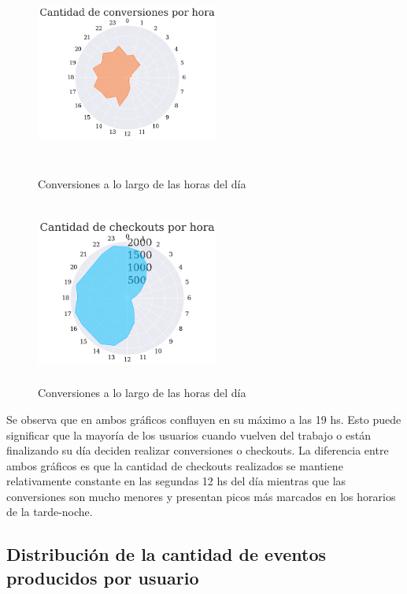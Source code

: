 \documentclass[a4paper]{article}
\begin{document}
\begin{figure}[h!]
	\centering
	\begin{minipage}[b]{0.4\textwidth}
		\includegraphics[width=6cm,height=6cm,keepaspectratio]{figures/040-hours-conversion-radarchart.png}
		\caption{Conversiones a lo largo de las horas del día}
	\end{minipage}
	\hfill
	\begin{minipage}[b]{0.4\textwidth}
		\includegraphics[width=6cm,height=6cm,keepaspectratio]{figures/041-hours-checkout-radarchart.png}
		\caption{Conversiones a lo largo de las horas del día}
	\end{minipage}
\end{figure}

Se observa que en ambos gráficos confluyen en su máximo a las 19 hs. Esto puede significar que la mayoría de los usuarios cuando vuelven del trabajo o están finalizando su día deciden realizar conversiones o checkouts. La diferencia entre ambos gráficos es que la cantidad de checkouts realizados se mantiene relativamente constante en las segundas 12 hs del día mientras que las conversiones son mucho menores y presentan picos más marcados en los horarios de la tarde-noche. 

\subsection{Distribución de la cantidad de eventos producidos por usuario}
\end{document}
